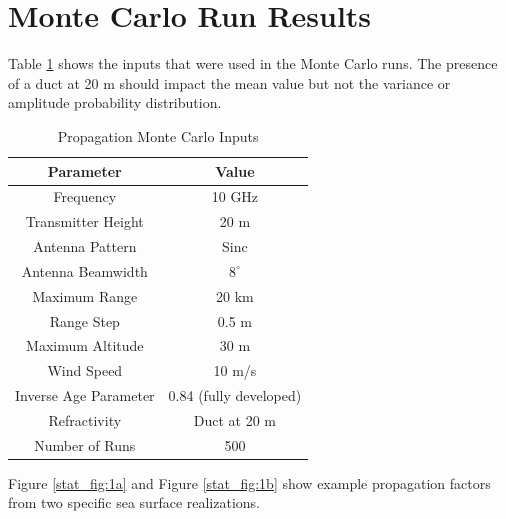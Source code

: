 \section{Monte Carlo Run Results}
Table \ref{stat_tab:0} shows the inputs that were used in the Monte Carlo runs. The presence of a duct at 20 m should impact the mean value but not the variance or amplitude probability distribution.
\begin{table}[H]
  \begin{center}
      \renewcommand{\baselinestretch}{1} \small\normalsize
  \begin{quote}
    \caption[Propagation Monte Carlo Inputs]{Propagation Monte Carlo Inputs\label{stat_tab:0}}
  \end{quote}
  \begin{tabular} {|c | c |}
    \hline
  \bf{Parameter} & \bf{Value}\\ \hline
  Frequency & 10 GHz \\ \hline
  Transmitter Height & 20 m  \\ \hline
  Antenna Pattern & Sinc  \\ \hline
  Antenna Beamwidth & $8^{\circ}$  \\ \hline
  Maximum Range & 20 km  \\ \hline
  Range Step & 0.5 m  \\ \hline
  Maximum Altitude & 30 m \\ \hline
  Wind Speed & 10 m/s \\ \hline
  Inverse Age Parameter & 0.84 (fully developed) \\ \hline
  Refractivity & Duct at 20 m \\ \hline
  Number of Runs & 500 \\ \hline
\end{tabular}
\end{center}
\end{table}
\renewcommand{\baselinestretch}{2} \small\normalsize


Figure \ref{stat_fig:1a} and Figure \ref{stat_fig:1b} show example propagation factors from two specific sea surface realizations.

